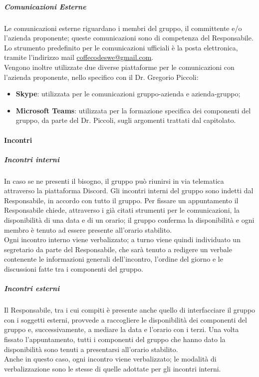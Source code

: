\documentclass[../norme-di-progetto.tex]{subfiles}
\begin{document}
\subparagraph{Comunicazioni Esterne}
Le comunicazioni esterne riguardano i membri del gruppo, il committente e/o l'azienda proponente; queste comunicazioni sono di competenza del Responsabile. Lo strumento predefinito per le comunicazioni ufficiali è la posta elettronica, tramite l'indirizzo mail \href{coffecodeswe@gmail.com}{coffecodeswe@gmail.com}. \\
Vengono inoltre utilizzate due diverse piattaforme per le comunicazioni con l'azienda proponente, nello specifico con il Dr. Gregorio Piccoli:
\begin{itemize}
  \item \textbf{Skype}: utilizzata per le comunicazioni gruppo-azienda e azienda-gruppo;
  \item \textbf{Microsoft Teams}: utilizzata per la formazione specifica dei componenti del gruppo, da parte del Dr. Piccoli, sugli argomenti trattati dal capitolato.
\end{itemize}

\paragraph{Incontri}
\subparagraph{Incontri interni}
In caso se ne presenti il bisogno, il gruppo può riunirsi in via telematica attraverso la piattaforma Discord. Gli incontri interni del gruppo sono indetti dal Responsabile, in accordo con tutto il gruppo. Per fissare un appuntamento il Responsabile chiede, attraverso i già citati strumenti per le comunicazioni, la disponibilità di una data e di un orario; il gruppo conferma la disponibilità e ogni membro è tenuto ad essere presente all'orario stabilito. \\
Ogni incontro interno viene verbalizzato; a turno viene quindi individuato un segretario da parte del Responsabile, che sarà tenuto a redigere un verbale contenente le informazioni generali dell'incontro, l'ordine del giorno e le discussioni fatte tra i componenti del gruppo.
\subparagraph{Incontri esterni}
Il Responsabile, tra i cui compiti è presente anche quello di interfacciare il gruppo con i soggetti esterni, provvede a raccogliere le disponibilità dei componenti del gruppo e, successivamente, a mediare la data e l'orario con i terzi. Una volta fissato l'appuntamento, tutti i componenti del gruppo che hanno dato la disponibilità sono tenuti a presentarsi all'orario stabilito. \\
Anche in questo caso, ogni incontro viene verbalizzato; le modalità di verbalizzazione sono le stesse di quelle adottate per gli incontri interni.
\end{document}
